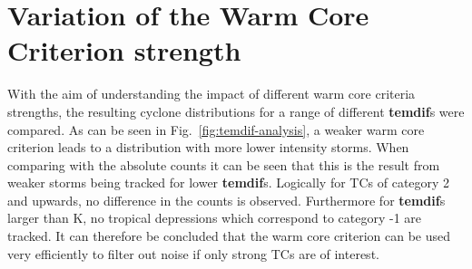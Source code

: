 \section{Variation of the Warm Core Criterion strength}
With the aim of understanding the impact of different warm core criteria strengths, the resulting cyclone distributions for a range of different \textbf{temdif}s were compared. As can be seen in Fig.~\ref{fig:temdif-analysis}, a weaker warm core criterion leads to a distribution with more lower intensity storms. When comparing with the absolute counts it can be seen that this is the result from weaker storms being tracked for lower \textbf{temdif}s. Logically for TCs of category 2 and upwards, no difference in the counts is observed. Furthermore for \textbf{temdif}s larger than \unit[1]{K}, no tropical depressions which correspond to category -1 are tracked. It can therefore be concluded that the warm core criterion can be used very efficiently to filter out noise if only strong TCs are of interest.
